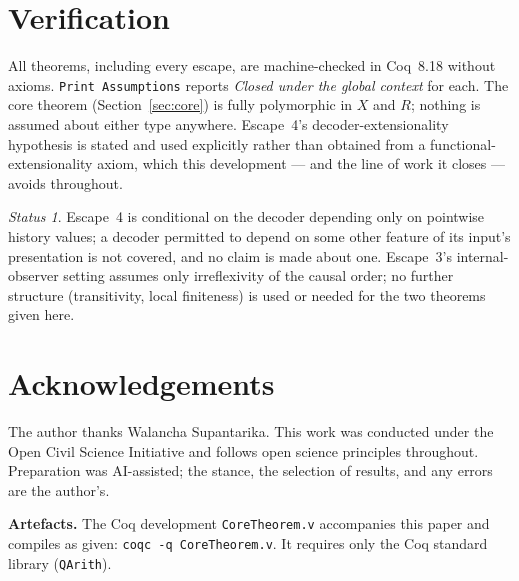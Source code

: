 \documentclass[10pt,twocolumn]{article}
\theoremstyle{plain}
\theoremstyle{definition}
\theoremstyle{remark}
\newtheorem*{status}{Status}
\begin{document}
\section{Verification}\label{sec:verification}

All theorems, including every escape, are machine-checked in Coq~8.18 without axioms. \texttt{Print Assumptions} reports \emph{Closed under the global context} for each. The core theorem (Section~\ref{sec:core}) is fully polymorphic in $X$ and $R$; nothing is assumed about either type anywhere. Escape~4's decoder-extensionality hypothesis is stated and used explicitly rather than obtained from a functional-extensionality axiom, which this development --- and the line of work it closes --- avoids throughout.

\begin{status}
Escape~4 is conditional on the decoder depending only on pointwise history values; a decoder permitted to depend on some other feature of its input's presentation is not covered, and no claim is made about one. Escape~3's internal-observer setting assumes only irreflexivity of the causal order; no further structure (transitivity, local finiteness) is used or needed for the two theorems given here.
\end{status}

\section*{Acknowledgements}
\small
The author thanks Walancha Supantarika. This work was conducted under the Open Civil Science Initiative and follows open science principles throughout. Preparation was AI-assisted; the stance, the selection of results, and any errors are the author's.

\vspace{0.6em}
\noindent
\textbf{Artefacts.} The Coq development \texttt{CoreTheorem.v} accompanies this paper and compiles as given: \texttt{coqc -q CoreTheorem.v}. It requires only the Coq standard library (\texttt{QArith}).
\end{document}
